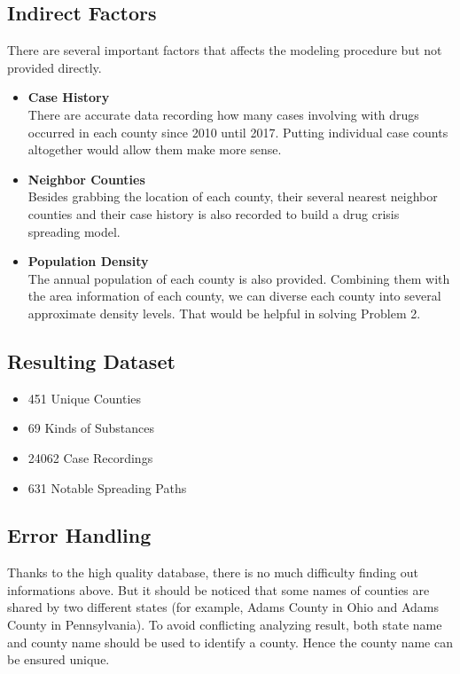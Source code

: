 \documentclass{mcmthesis}
\begin{document}
\subsection{Indirect Factors}
There are several important factors that affects the modeling procedure but not provided directly. 
\begin{itemize}
	\item \textbf{Case History}\\
	There are accurate data recording how many cases involving with drugs occurred in each county since 2010 until 2017. Putting individual case counts altogether would allow them make more sense.
	\item \textbf{Neighbor Counties}\\
	Besides grabbing the location of each county, their several nearest neighbor counties and their case history is also recorded to build a drug crisis spreading model.
	\item \textbf{Population Density}\\
	The annual population of each county is also provided. Combining them with the area information of each county, we can diverse each county into  several approximate density levels. That would be helpful in solving Problem 2.
\end{itemize}

\subsection{Resulting Dataset}
\begin{itemize}
	\item 451 Unique Counties
	\item 69 Kinds of Substances
	\item 24062 Case Recordings
	\item 631 Notable Spreading Paths
\end{itemize}

\subsection{Error Handling}
Thanks to the high quality database, there is no much difficulty finding out informations above. But it should be noticed that some names of counties are shared by two different states (for example, Adams County in Ohio and Adams County in Pennsylvania). To avoid conflicting analyzing result, both state name and county name should be used to identify a county. Hence the county name can be ensured unique.
\end{document}

